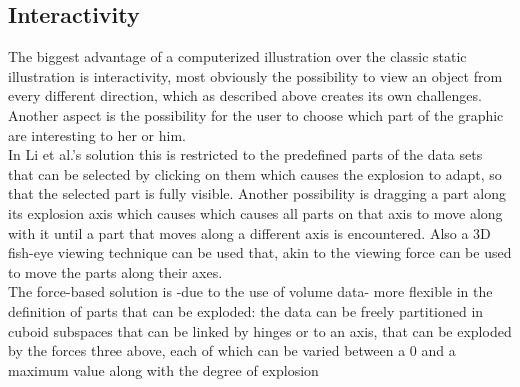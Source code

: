 \subsection{Interactivity}
The biggest advantage of a computerized illustration over the classic static illustration is interactivity, most obviously the possibility to view an object from every different direction, which as described above creates its own challenges. Another aspect is the possibility for the user to choose which part of the graphic are interesting to her or him.\\
 In Li et al.'s solution\cite{proc:Li:2008:AGI} this is restricted to the predefined parts of the data sets that can be selected by clicking on them which causes the explosion to adapt, so that the selected part is fully visible. Another possibility is dragging a part along its explosion axis which causes which causes all parts on that axis to move along with it until a part that moves along a different axis is encountered. Also a 3D fish-eye viewing technique can be used that, akin to the viewing force \cite{proc:bruckner-2006-EVV} can be used to move the parts along their axes.\\
The force-based solution is -due to the use of volume data- more flexible in the definition of parts that can be exploded: the data can be freely partitioned in cuboid subspaces that can be linked by hinges or to an axis, that can be exploded by the forces three above, each of which can be varied between a 0 and a maximum value along  with the degree of explosion\\
